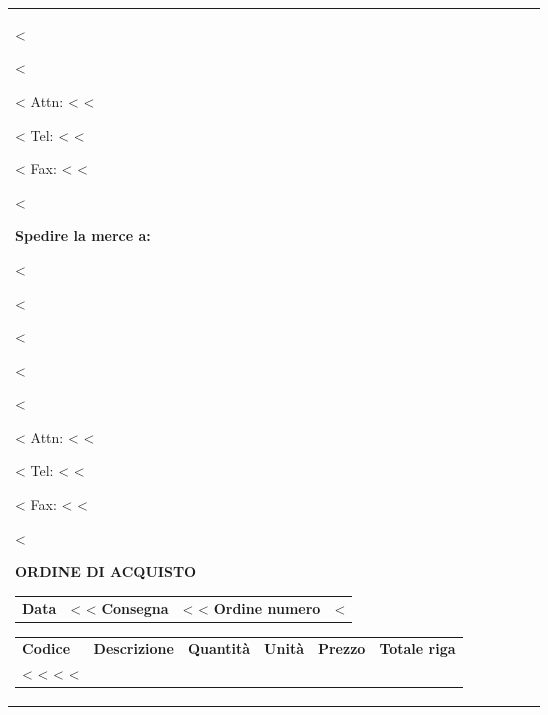 \documentclass[twoside]{scrartcl}
\begin{document}
{{{\begin{tabularx}{\textwidth}{@{}lXrlrr@{}}
{<%

<%

\vspace{0.3cm}

<%
Attn: <%
\vspace{0.3cm}
<%

<%
Tel: <%
<%

<%
Fax: <%
<%

<%
}
\parbox[t]{7.5cm}{
\textbf{Spedire la merce a:}
\vspace{0.3cm}

<%

<%

<%

<%

<%

\vspace{0.3cm}

<%
Attn: <%
\vspace{0.3cm}
<%

<%
Tel: <%
<%

<%
Fax: <%
<%

<%
}
\hfill

\vspace{1cm}

\textbf{ORDINE DI ACQUISTO}
\hfill
\begin{tabular}[t]{l@{\hspace{0.3cm}}l}
  \textbf{Data} & <%
<%
  \textbf{Consegna} & <%
<%
  \textbf{Ordine numero} & <%
\end{tabular}

\vspace{1cm}

\begin{tabularx}{\textwidth}{@{}lXrlrr@{}}
  \textbf{Codice} & \textbf{Descrizione} & \textbf{Quantit\`a} &
    \textbf{Unit\`a} & \textbf{Prezzo} & \textbf{Totale riga} \\
<%
  <%
    <%
<%
\end{tabularx}



\end{tabularx}}}}
\end{document}
